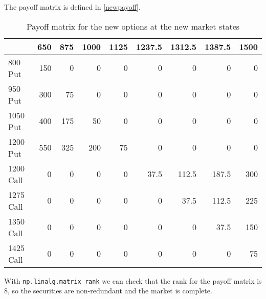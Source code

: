 \documentclass{article}
\begin{document}
The payoff matrix is defined in \autoref{newpayoff}.

\begin{table}
    \centering
    \caption{Payoff matrix for the new options at the new market states \label{newpayoff}}
    \begin{tabular}{lrrrrrrrr}
        \toprule
                  & 650 & 875 & 1000 & 1125 & 1237.5 & 1312.5 & 1387.5 & 1500 \\
        \midrule
        800 Put   & 150 & 0   & 0    & 0    & 0      & 0      & 0      & 0    \\
        950 Put   & 300 & 75  & 0    & 0    & 0      & 0      & 0      & 0    \\
        1050 Put  & 400 & 175 & 50   & 0    & 0      & 0      & 0      & 0    \\
        1200 Put  & 550 & 325 & 200  & 75   & 0      & 0      & 0      & 0    \\
        1200 Call & 0   & 0   & 0    & 0    & 37.5   & 112.5  & 187.5  & 300  \\
        1275 Call & 0   & 0   & 0    & 0    & 0      & 37.5   & 112.5  & 225  \\
        1350 Call & 0   & 0   & 0    & 0    & 0      & 0      & 37.5   & 150  \\
        1425 Call & 0   & 0   & 0    & 0    & 0      & 0      & 0      & 75   \\
        \bottomrule
    \end{tabular}
\end{table}

With \verb|np.linalg.matrix_rank| we can check that the rank for the payoff matrix is 8,
so the securities are non-redundant and the market is complete.
\end{document}
